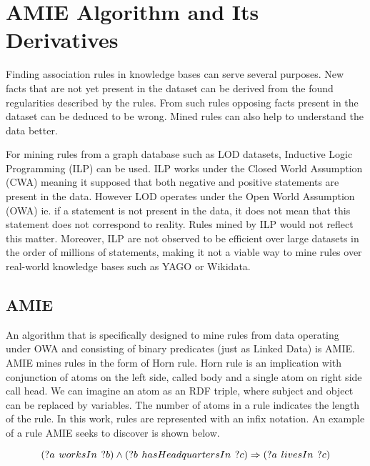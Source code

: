 \chapter{AMIE Algorithm and Its Derivatives\label{amieandits}}

Finding association rules in knowledge bases can serve several purposes. New facts that are not yet present in the dataset can be derived from the found regularities described by the rules. From such rules opposing facts present in the dataset can be deduced to be wrong. Mined rules can also help to understand the data better.

For mining rules from a graph database such as LOD datasets, Inductive Logic Programming (ILP) can be used. ILP works under the Closed World Assumption (CWA) meaning it supposed that both negative and positive statements are present in the data. However LOD operates under the Open World Assumption (OWA) ie. if a statement is not present in the data, it does not mean that this statement does not correspond to reality. Rules mined by ILP would not reflect this matter. Moreover, ILP are not observed to be efficient over large datasets in the order of millions of statements, making it not a viable way to mine rules over real-world knowledge bases such as YAGO or Wikidata.

\section{AMIE\label{amie}}

An algorithm that is specifically designed to mine rules from data operating under OWA and consisting of binary predicates (just as Linked Data) is AMIE.\cite{Galarraga2013} AMIE mines rules in the form of Horn rule. Horn rule is an implication with conjunction of atoms on the left side, called body and a single atom on right side call head. We can imagine an atom as an RDF triple, where subject and object can be replaced by variables. The number of atoms in a rule indicates the length of the rule. In this work, rules are represented with an infix notation. An example of a rule AMIE seeks to discover is shown below. 

\label{asocRule}
$$
(?a\hspace{0.4em}worksIn\hspace{0.4em}?b) \land
(?b\hspace{0.4em}hasHeadquartersIn\hspace{0.4em}?c) \Rightarrow
(?a\hspace{0.4em}livesIn\hspace{0.4em}?c)
$$

